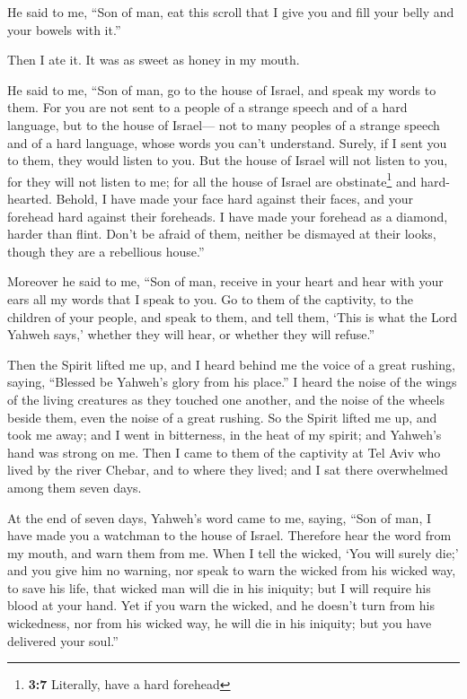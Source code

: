  He said to me, ``Son of man, eat this scroll that I give
you and fill your belly and your bowels with it.''

Then I ate it. It was as sweet as honey in my mouth.

 He said to me, ``Son of man, go to the house of Israel,
and speak my words to them.  For you are not sent to a
people of a strange speech and of a hard language, but to the house of
Israel---  not to many peoples of a strange speech and of
a hard language, whose words you can't understand. Surely, if I sent you
to them, they would listen to you.  But the house of
Israel will not listen to you, for they will not listen to me; for all
the house of Israel are obstinate\footnote{\textbf{3:7} Literally, have
  a hard forehead} and hard-hearted.  Behold, I have made
your face hard against their faces, and your forehead hard against their
foreheads.  I have made your forehead as a diamond, harder
than flint. Don't be afraid of them, neither be dismayed at their looks,
though they are a rebellious house.''

 Moreover he said to me, ``Son of man, receive in your
heart and hear with your ears all my words that I speak to you.
 Go to them of the captivity, to the children of your
people, and speak to them, and tell them, `This is what the Lord Yahweh
says,' whether they will hear, or whether they will refuse.''

 Then the Spirit lifted me up, and I heard behind me the
voice of a great rushing, saying, ``Blessed be Yahweh's glory from his
place.''  I heard the noise of the wings of the living
creatures as they touched one another, and the noise of the wheels
beside them, even the noise of a great rushing.  So the
Spirit lifted me up, and took me away; and I went in bitterness, in the
heat of my spirit; and Yahweh's hand was strong on me. 
Then I came to them of the captivity at Tel Aviv who lived by the river
Chebar, and to where they lived; and I sat there overwhelmed among them
seven days.

 At the end of seven days, Yahweh's word came to me,
saying,  ``Son of man, I have made you a watchman to the
house of Israel. Therefore hear the word from my mouth, and warn them
from me.  When I tell the wicked, `You will surely die;'
and you give him no warning, nor speak to warn the wicked from his
wicked way, to save his life, that wicked man will die in his iniquity;
but I will require his blood at your hand.  Yet if you
warn the wicked, and he doesn't turn from his wickedness, nor from his
wicked way, he will die in his iniquity; but you have delivered your
soul.''


